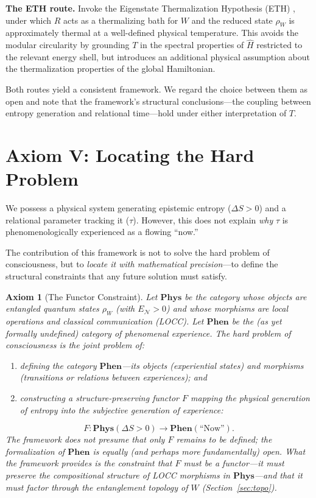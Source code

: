 \documentclass[12pt, a4paper]{article}
\newtheorem{axiom}{Axiom}
\begin{document}
\medskip
\noindent\textbf{The ETH route.} Invoke the Eigenstate Thermalization Hypothesis (ETH) \cite{Srednicki1994}, under which $R$ acts as a thermalizing bath for $W$ and the reduced state $\rho_W$ is approximately thermal at a well-defined physical temperature. This avoids the modular circularity by grounding $T$ in the spectral properties of $\hat{H}$ restricted to the relevant energy shell, but introduces an additional physical assumption about the thermalization properties of the global Hamiltonian.

\medskip
\noindent Both routes yield a consistent framework. We regard the choice between them as open and note that the framework's structural conclusions---the coupling between entropy generation and relational time---hold under either interpretation of $T$.

\section{Axiom V: Locating the Hard Problem}
\label{sec:axiom5}

We possess a physical system generating epistemic entropy ($\Delta S > 0$) and a relational parameter tracking it ($\tau$). However, this does not explain \emph{why} $\tau$ is phenomenologically experienced as a flowing ``now.''

The contribution of this framework is not to solve the hard problem of consciousness, but to \emph{locate it with mathematical precision}---to define the structural constraints that any future solution must satisfy.

\begin{axiom}[The Functor Constraint]
Let $\mathbf{Phys}$ be the category whose objects are entangled quantum states $\rho_W$ (with $E_{\mathcal{N}} > 0$) and whose morphisms are local operations and classical communication (LOCC). Let $\mathbf{Phen}$ be the (as yet formally undefined) category of phenomenal experience. The hard problem of consciousness is the joint problem of:
\begin{enumerate}[label=(\roman*)]
    \item defining the category $\mathbf{Phen}$---its objects (experiential states) and morphisms (transitions or relations between experiences); and
    \item constructing a structure-preserving functor $F$ mapping the physical generation of entropy into the subjective generation of experience:
\end{enumerate}
\begin{equation}
F : \mathbf{Phys}(\Delta S > 0) \longrightarrow \mathbf{Phen}(\text{``Now''}).
\label{eq:functor}
\end{equation}
The framework does not presume that only $F$ remains to be defined; the formalization of $\mathbf{Phen}$ is equally (and perhaps more fundamentally) open. What the framework provides is the constraint that $F$ must be a functor---it must preserve the compositional structure of LOCC morphisms in $\mathbf{Phys}$---and that it must factor through the entanglement topology of $W$ (Section~\ref{sec:topo}).
\end{axiom}
\end{document}
